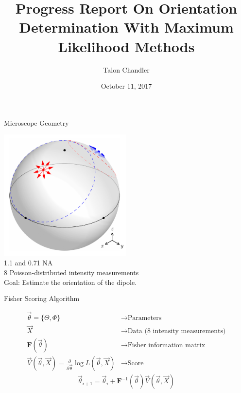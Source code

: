\documentclass[presentation]{beamer}
\author{Talon Chandler}
\date{October 11, 2017}
\title{Progress Report On Orientation Determination With Maximum Likelihood Methods}
\begin{document}
\maketitle
\begin{frame}[label=sec-1]{Microscope Geometry}
\begin{center}
  \includegraphics[width=0.5\textwidth, interpolate=true]{figs/geometry.pdf}\\
  1.1 and 0.71 NA\\
  8 Poisson-distributed intensity measurements\\
  Goal: Estimate the orientation of the dipole.
\end{center}
\end{frame}
\begin{frame}[label=sec-2]{Fisher Scoring Algorithm}
\begin{center}
\begin{align*}
  \vec{\theta} = \{\Theta, \Phi\} &\rightarrow \text{Parameters}\\
  \vec{X}  &\rightarrow \text{Data (8 intensity measurements)}\\
  \textbf{F}(\vec{\theta}) &\rightarrow \text{Fisher information matrix}\\
  \vec{V}(\vec{\theta}, \vec{X}) = \frac{\partial}{\partial \vec{\theta}} \log L(\vec{\theta}, \vec{X}) &\rightarrow \text{Score}
\end{align*}
\begin{align*}
  \vec{\theta}_{i+1} = \vec{\theta}_{i} + \textbf{F}^{-1}(\vec{\theta})\vec{V}(\vec{\theta}, \vec{X})
\end{align*}
\end{center}
\end{frame}
\end{document}
